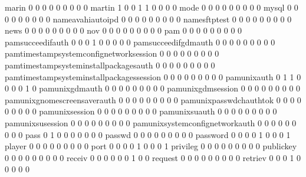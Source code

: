 \documentclass[compress,8pt]{beamer}
\begin{document}
\begin{frame}
\begin{Schunk}
  marin                                      0   0   0   0   0   0   0   0   0
  martin                                     1   0   0   1   1   0   0   0   0
  mode                                       0   0   0   0   0   0   0   0   0
  mysql                                      0   0   0   0   0   0   0   0   0
  nameavahiautoipd                           0   0   0   0   0   0   0   0   0
  namesftptest                               0   0   0   0   0   0   0   0   0
  news                                       0   0   0   0   0   0   0   0   0
  nov                                        0   0   0   0   0   0   0   0   0
  pam                                        0   0   0   0   0   0   0   0   0
  pamsucceedifauth                           0   0   0   1   0   0   0   0   0
  pamsucceedifgdmauth                        0   0   0   0   0   0   0   0   0
  pamtimestampsystemconfignetworksession     0   0   0   0   0   0   0   0   0
  pamtimestampsysteminstallpackagesauth      0   0   0   0   0   0   0   0   0
  pamtimestampsysteminstallpackagessession   0   0   0   0   0   0   0   0   0
  pamunixauth                                0   1   1   0   0   0   0   1   0
  pamunixgdmauth                             0   0   0   0   0   0   0   0   0
  pamunixgdmsession                          0   0   0   0   0   0   0   0   0
  pamunixgnomescreensaverauth                0   0   0   0   0   0   0   0   0
  pamunixpasswdchauthtok                     0   0   0   0   0   0   0   0   0
  pamunixsession                             0   0   0   0   0   0   0   0   0
  pamunixsuauth                              0   0   0   0   0   0   0   0   0
  pamunixsusession                           0   0   0   0   0   0   0   0   0
  pamunixsystemconfignetworkauth             0   0   0   0   0   0   0   0   0
  pass                                       0   1   0   0   0   0   0   0   0
  passwd                                     0   0   0   0   0   0   0   0   0
  password                                   0   0   0   0   1   0   0   0   1
  player                                     0   0   0   0   0   0   0   0   0
  port                                       0   0   0   0   1   0   0   0   1
  privileg                                   0   0   0   0   0   0   0   0   0
  publickey                                  0   0   0   0   0   0   0   0   0
  receiv                                     0   0   0   0   0   0   1   0   0
  request                                    0   0   0   0   0   0   0   0   0
  retriev                                    0   0   0   1   0   0   0   0   0

\end{Schunk}
\end{frame}
\end{document}
